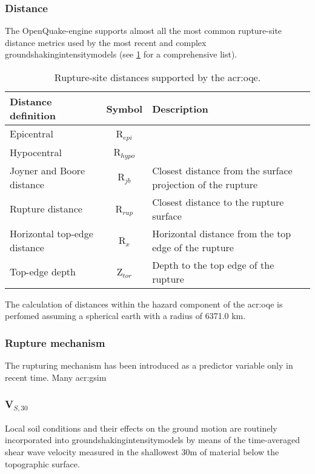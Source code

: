 \subsubsection{Distance}
%
The OpenQuake-engine supports almost all the most common rupture-site 
distance metrics used by the most recent and complex 
\glspl{groundshakingintensitymodel} (see \ref{tab:distances} for a 
comprehensive list).
%
\begin{table}[!b]
\centering
\begin{tabular}{p{5cm}cp{5cm}}
\hline
\rowcolor{anti-flashwhite}
\bf{Distance definition} & \bf{Symbol} & \bf{Description} \\
\hline 
Epicentral & R$_{epi}$ & \\
Hypocentral & R$_{hypo}$ & \\
Joyner and Boore distance & R$_{jb}$ & Closest distance from the surface 
    projection of the rupture \\
Rupture distance & R$_{rup}$ & Closest distance to the rupture surface \\
Horizontal top-edge distance & R$_{x}$ & Horizontal distance from the top 
    edge of the rupture \\
Top-edge depth & Z$_{tor}$ & Depth to the top edge of the rupture \\
\hline
\end{tabular}
\caption{Rupture-site distances supported by the \gls{acr:oqe}.}
\label{tab:distances}
\end{table}
%
The calculation of distances within the hazard component of the \gls{acr:oqe} 
is perfomed assuming a spherical earth with a radius of 6371.0 km. 
%
\subsubsection{Rupture mechanism}
The rupturing mechanism has been introduced as a predictor variable only in 
recent time. Many \gls{acr:gsim} 
%
\subsubsection{V$_{S,30}$}
%
Local soil conditions and their effects on the ground motion are routinely 
incorporated into \glspl{groundshakingintensitymodel} by means of the 
time-averaged shear wave velocity measured in the shallowest 30m of material 
below the topographic surface. 

